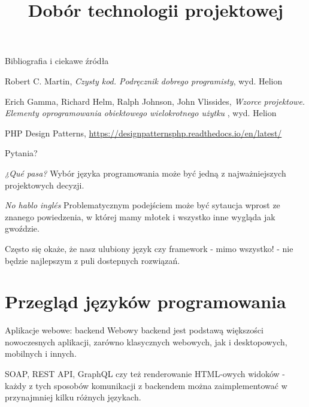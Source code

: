\begin{frame}{Bibliografia i ciekawe źródła}
  
	\begin{thebibliography}{9}
	
		Robert C. Martin,
		\textit{Czysty kod. Podręcznik dobrego programisty},
		wyd. Helion
	
		 Erich Gamma, Richard Helm, Ralph Johnson, John Vlissides,
		\textit{Wzorce projektowe. Elementy oprogramowania obiektowego wielokrotnego użytku },
		wyd. Helion
		
		PHP Design Patterns,
		\url{https://designpatternsphp.readthedocs.io/en/latest/}
	
	\end{thebibliography}

\end{frame}

\begin{frame}[standout]
	Pytania?
\end{frame}










\title{Dobór technologii projektowej}
\maketitle

\begin{frame}{\emph{¿Qué pasa?}}		
	Wybór języka programowania może być jedną z najważniejszych projektowych decyzji.
\end{frame}

\begin{frame}{\emph{No hablo inglés}}		
	Problematycznym podejściem może być sytaucja wprost ze znanego powiedzenia, w której mamy młotek i wszystko inne wygląda jak gwoździe.
	
	Często się okaże, że nasz ulubiony język czy framework - mimo wszystko! - nie będzie najlepszym z puli dostepnych rozwiązań.
\end{frame}

\section{Przegląd języków programowania}

\begin{frame}{Aplikacje webowe: backend}		
	Webowy backend jest podstawą większości nowoczesnych aplikacji, zarówno klasycznych webowych, jak i desktopowych, mobilnych i innych.
	
	SOAP, REST API, GraphQL czy też renderowanie HTML-owych widoków - każdy z tych sposobów komunikacji z backendem można zaimplementować w przynajmniej kilku różnych językach.
\end{frame}

